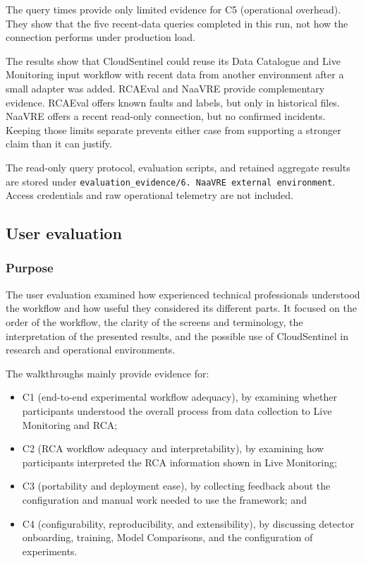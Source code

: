 The query times provide only limited evidence for C5 (operational overhead). They show that the five recent-data queries completed in this run, not how the connection performs under production load.

The results show that CloudSentinel could reuse its Data Catalogue and Live Monitoring input workflow with recent data from another environment after a small adapter was added. RCAEval and NaaVRE provide complementary evidence. RCAEval offers known faults and labels, but only in historical files. NaaVRE offers a recent read-only connection, but no confirmed incidents. Keeping those limits separate prevents either case from supporting a stronger claim than it can justify.

The read-only query protocol, evaluation scripts, and retained aggregate results are stored under \texttt{evaluation\_evidence/6. NaaVRE external environment}. Access credentials and raw operational telemetry are not included.

\subsection{User evaluation}

\subsubsection{Purpose}

The user evaluation examined how experienced technical professionals understood the workflow and how useful they considered its different parts. It focused on the order of the workflow, the clarity of the screens and terminology, the interpretation of the presented results, and the possible use of CloudSentinel in research and operational environments.

The walkthroughs mainly provide evidence for:

\begin{itemize}
    \item C1 (end-to-end experimental workflow adequacy), by examining whether participants understood the overall process from data collection to Live Monitoring and RCA;
    \item C2 (RCA workflow adequacy and interpretability), by examining how participants interpreted the RCA information shown in Live Monitoring;
    \item C3 (portability and deployment ease), by collecting feedback about the configuration and manual work needed to use the framework; and
    \item C4 (configurability, reproducibility, and extensibility), by discussing detector onboarding, training, Model Comparisons, and the configuration of experiments.
\end{itemize}

